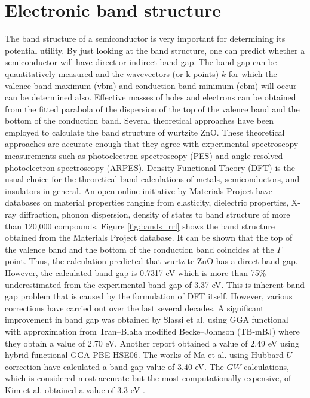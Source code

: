 
\section{Electronic band structure}
The band structure  of a semiconductor is very important for determining its potential utility. By just looking at the band structure, one can predict whether a semiconductor will have  direct or indirect band gap. The band gap can be quantitatively measured  and the wavevectors (or k-points) $k$ for which the valence band maximum (vbm) and conduction band minimum (cbm) will occur can be determined also. Effective masses of holes and electrons can be obtained from the fitted parabola of the dispersion of the top of the valence band and the bottom of the conduction band.  Several theoretical approaches have been employed to calculate the band structure of wurtzite ZnO. These theoretical approaches are accurate enough that they agree with experimental spectroscopy  measurements such as photoelectron spectroscopy (PES) and angle-resolved photoelectron spectroscopy (ARPES). Density Functional Theory (DFT) is the usual choice for the theoretical band calculations of metals, semiconductors, and insulators in general. An open online initiative by Materials Project \citep{Jain2013,Ong2015} have databases on material properties ranging from elasticity, dielectric properties, X-ray diffraction, phonon dispersion, density of states to band structure of more than 120,000 compounds. Figure \ref{fig:bands_rrl} shows the band structure obtained from the Materials Project database. It can be shown that the top of the valence band and the bottom of the conduction band coincides at the $\Gamma$ point. Thus, the calculation predicted that wurtzite ZnO has a direct band gap. However, the calculated band gap is 0.7317 eV which is more than 75\% underestimated from the experimental band gap of 3.37 eV. This is inherent band gap problem  that is caused by the formulation of DFT itself. However, various corrections have carried out over the last several decades. A significant improvement in band gap was obtained by Slassi et al. \citep{Slassi2014} using GGA functional with approximation from Tran–Blaha modified Becke–Johnson (TB-mBJ) where they obtain a value of 2.70 eV. Another report \citep{Luo2014} obtained a value of  2.49 eV using hybrid functional GGA-PBE-HSE06. The works of Ma et al. \citep{Ma2013} using Hubbard-$U$ correction have calculated a band gap value of 3.40 eV. The $GW$ calculations, which is considered most accurate but the most computationally expensive, of Kim et al. obtained a value of 3.3 eV \citep{Kim2012}. 


